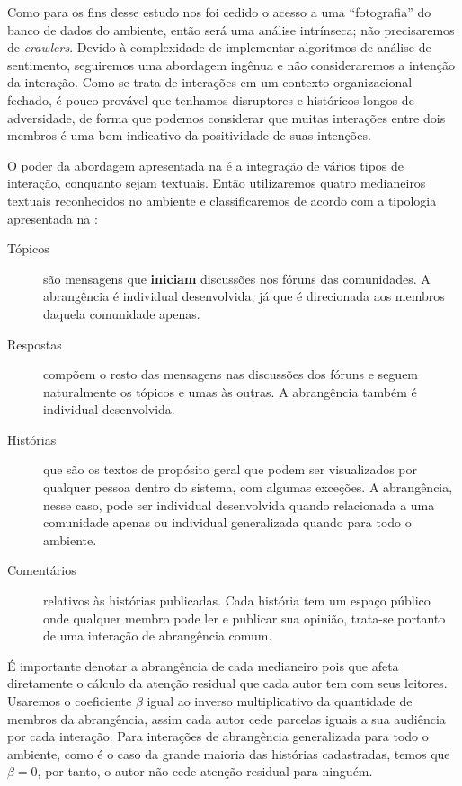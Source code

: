 Como para os fins desse estudo nos foi cedido o acesso a uma ``fotografia'' do
banco de dados do ambiente, então será uma análise intrínseca; não precisaremos
de \emph{crawlers}. Devido à complexidade de implementar algoritmos de análise de
sentimento, seguiremos uma abordagem ingênua e não consideraremos a intenção da
interação. Como se trata de interações em um contexto organizacional fechado, é
pouco provável que tenhamos disruptores e históricos longos de adversidade, de
forma que podemos considerar que muitas interações entre dois membros é uma bom
indicativo da positividade de suas intenções.

O poder da abordagem apresentada na  é a integração
de vários tipos de interação, conquanto sejam textuais. Então utilizaremos
quatro medianeiros textuais reconhecidos no ambiente e classificaremos de
acordo com a tipologia apresentada na :

\begin{description}
\item[Tópicos] são mensagens que \textbf{iniciam} discussões nos fóruns das
comunidades. A abrangência é individual desenvolvida, já que é direcionada aos
membros daquela comunidade apenas.
\item[Respostas] compõem o resto das mensagens nas discussões dos fóruns e
seguem naturalmente os tópicos e umas às outras. A abrangência também é
individual desenvolvida.
\item[Histórias] que são os textos de propósito geral que podem ser visualizados
por qualquer pessoa dentro do sistema, com algumas exceções. A abrangência,
nesse caso, pode ser individual desenvolvida quando relacionada a uma comunidade
apenas ou individual generalizada quando para todo o ambiente.
\item[Comentários] relativos às histórias publicadas. Cada história tem um
espaço público onde qualquer membro pode ler e publicar sua opinião, trata-se
portanto de uma interação de abrangência comum.
\end{description}

É importante denotar a abrangência de cada medianeiro pois que afeta diretamente
o cálculo da atenção residual que cada autor tem com seus leitores. Usaremos o
coeficiente $\beta$ igual ao inverso multiplicativo da quantidade de membros da
abrangência, assim cada autor cede parcelas iguais a sua audiência por cada
interação. Para interações de abrangência generalizada para todo o ambiente, como
é o caso da grande maioria das histórias cadastradas, temos que $\beta=0$, por
tanto, o autor não cede atenção residual para ninguém.

